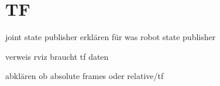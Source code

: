 \section{TF}
joint state publisher erklären für was
robot state publisher

verweis rviz braucht tf daten

abklären ob absolute frames oder relative/tf

